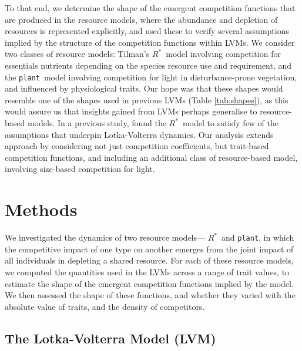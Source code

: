 \documentclass[a4paper,11pt]{article}
\newcommand{\Rstar}{\ensuremath{R^*}}
\newcommand{\plant}{{\tt plant}}
\begin{document}
To that end, we determine the shape of the emergent competition functions that are produced in the resource models, where the abundance and depletion of resources is represented explicitly, and used these to verify several assumptions implied by the structure of the competition functions within LVMs. We consider two classes of resource models: Tilman's \Rstar\ model involving competition for essentials nutrients depending on the species resource use and requirement, and the \plant\ model involving competition for light in disturbance-prone vegetation, and influenced by physiological traits. Our hope was that these shapes would resemble one of the shapes used in previous LVMs (Table \ref{tab:shapes}), as this would assure us that insights gained from LVMs perhaps generalise to resource-based models. In a previous study, \citet{Abrams-2008} found the \Rstar\ model to satisfy few of the assumptions that underpin Lotka-Volterra dynamics. Our analysis extends \citeauthor{Abrams-2008} approach by considering not just competition coefficients, but trait-based competition functions, and including an additional class of resource-based model, involving size-based competition for light.

\section{Methods}

We investigated the dynamics of two resource models--- \Rstar\  and \plant, in which the competitive impact of one type on another emerges from the joint impact of all individuals in depleting a shared resource. For each of these resource models, we computed the quantities used in the LVMs across a range of trait values, to estimate the shape of the emergent competition functions implied by the model. We then assessed the shape of these functions, and whether they varied with the absolute value of traits, and the density of competitors.

\subsection{The Lotka-Volterra Model (LVM)}
\end{document}
